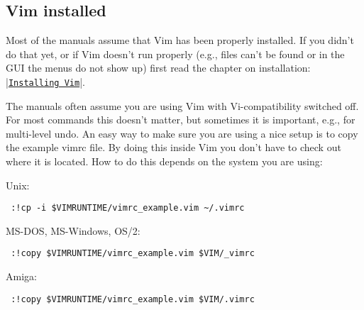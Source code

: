 %
%
%
%
%

\subsection{Vim installed}
Most of the manuals assume that Vim has been properly installed.
If you didn't do that yet, or if Vim doesn't run properly (e.g., files can't be found or in the GUI the menus do not show up) first read the chapter on installation: |\hyperref[Installing Vim]{\texttt{Installing Vim}}|.

\label{not-compatible}
The manuals often assume you are using Vim with Vi-compatibility switched off.
For most commands this doesn't matter, but sometimes it is important, e.g., for multi-level undo.
An easy way to make sure you are using a nice setup is to copy the example vimrc file.
By doing this inside Vim you don't have to check out where it is located.
How to do this depends on the system you are using:

Unix:
\begin{verbatim}
 :!cp -i $VIMRUNTIME/vimrc_example.vim ~/.vimrc
\end{verbatim}
MS-DOS, MS-Windows, OS/2:
\begin{verbatim}
 :!copy $VIMRUNTIME/vimrc_example.vim $VIM/_vimrc
\end{verbatim}
Amiga:
\begin{verbatim}
 :!copy $VIMRUNTIME/vimrc_example.vim $VIM/.vimrc
\end{verbatim}

